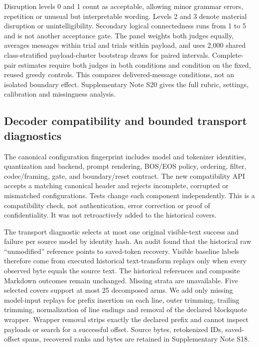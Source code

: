 \documentclass[fleqn,10pt]{wlscirep}
\begin{document}
Disruption levels 0 and 1 count as acceptable, allowing minor grammar errors, repetition or unusual but interpretable wording. Levels 2 and 3 denote material disruption or unintelligibility. Secondary logical connectedness runs from 1 to 5 and is not another acceptance gate. The panel weights both judges equally, averages messages within trial and trials within payload, and uses 2,000 shared class-stratified payload-cluster bootstrap draws for paired intervals. Complete-pair estimates require both judges in both conditions and condition on the fixed, reused greedy controls. This compares delivered-message conditions, not an isolated boundary effect. Supplementary Note S20 gives the full rubric, settings, calibration and missingness analysis.


\subsection*{Decoder compatibility and bounded transport diagnostics}\label{sec:v4-compatibility}
The canonical configuration fingerprint includes model and tokenizer identities, quantization and backend, prompt rendering, BOS/EOS policy, ordering, filter, codec/framing, gate, and boundary/reset contract. The new compatibility API accepts a matching canonical header and rejects incomplete, corrupted or mismatched configurations. Tests change each component independently. This is a compatibility check, not authentication, error correction or proof of confidentiality. It was not retroactively added to the historical covers.

The transport diagnostic selects at most one original visible-text success and failure per source model by identity hash. An audit found that the historical raw ``unmodified'' reference points to saved-token recovery. Visible baseline labels therefore come from executed historical text-transform replays only when every observed byte equals the source text. The historical references and composite Markdown outcomes remain unchanged. Missing strata are unavailable. Five selected covers support at most 25 decomposed arms. We add only missing model-input replays for prefix insertion on each line, outer trimming, trailing trimming, normalization of line endings and removal of the declared blockquote wrapper. Wrapper removal strips exactly the declared prefix and cannot inspect payloads or search for a successful offset. Source bytes, retokenized IDs, saved-offset spans, recovered ranks and bytes are retained in Supplementary Note S18.
\end{document}
